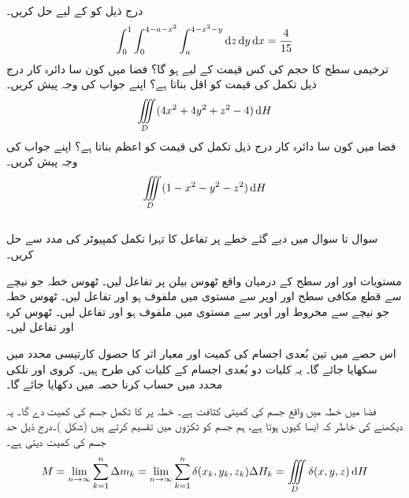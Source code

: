 \\
درج ذیل کو  کے لیے حل کریں۔
\begin{align*}
\int_0^1\int_0^{4-a-x^2}\int_a^{4-x^2-y}\dif z\dif y\dif x=\frac{4}{15}
\end{align*}
ترخیمی سطح  کا حجم   کی کس قیمت کے لیے  ہو گا؟
فضا میں  کون سا دائرہ کار  درج ذیل تکمل کی قیمت کو اقل  بناتا ہے؟ اپنے جواب کی وجہ پیش کریں۔
\begin{align*}
\iiint\limits_D (4x^2+4y^2+z^2-4)\dif H
\end{align*}
فضا میں کون سا دائرہ کار  درج ذیل تکمل کی قیمت کو اعظم بناتا ہے؟ اپنے جواب کی وجہ پیش کریں۔
\begin{align*}
\iiint\limits_D (1-x^2-y^2-z^2)\dif H
\end{align*}
\\
سوال  تا سوال  میں دیے گئے خطے  پر  تفاعل کا تہرا تکمل کمپیوٹر کی مدد سے حل کریں۔

مستویات  اور   اور سطح  کے درمیان واقع ٹھوس بیلن پر تفاعل   لیں۔
ٹھوس خطہ جو نیچے سے   قطع مکافی سطح   اور اوپر سے مستوی   میں ملفوف ہو اور تفاعل  لیں۔
ٹھوس خطہ جو نیچے سے مخروط  اور اوپر سے مستوی  میں ملفوف ہو  اور تفاعل لیں۔ 
ٹھوس کرہ   اور تفاعل  لیں۔


اس حصے میں تین بُعدی اجسام کی  کمیت اور معیار اثر کا حصول کارتیسی محدد میں سکھایا جائے گا۔ یہ کلیات دو بُعدی  اجسام کے کلیات کی طرح ہیں۔ کروی اور نلکی محدد میں حساب کرنا  حصہ  میں دکھایا جائے گا۔

فضا میں خطہ  میں واقع جسم کی  کمیتی کثافت  ہے۔ خطہ  پر  کا تکمل  جسم کی کمیت دے گا۔ یہ دیکھنے کی خاطر کہ ایسا کیوں  ہوتا ہے،  ہم   جسم کو  ٹکڑوں  میں تقسیم کرتے ہیں (شکل )۔درج ذیل حد  جسم کی کمیت دیتی ہے۔
\begin{align}\label{مساوات_بالکثرت_تین_بعدی_کمیت}
M=\lim_{n\to\infty}\sum_{k=1}^{n}\Delta m_k=\lim_{n\to\infty}\sum_{k=1}^{n}\delta(x_k,y_k,z_k)\Delta H_k=\iiint\limits_D \delta(x,y,z) \dif H
\end{align}

